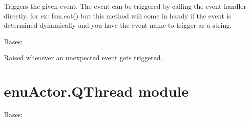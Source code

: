 \documentclass[letterpaper,10pt,english]{sphinxmanual}
\begin{document}
\begin{fulllineitems}
\begin{fulllineitems}
\end{fulllineitems}


\begin{fulllineitems}
\label{enuActor:enuActor.MyFSM.Fysom.trigger}
Triggers the given event.
The event can be triggered by calling the event handler directly, for ex: fsm.eat()
but this method will come in handy if the event is determined dynamically and you have
the event name to trigger as a string.

\end{fulllineitems}


\end{fulllineitems}


\begin{fulllineitems}
\label{enuActor:enuActor.MyFSM.FysomError}
Bases: 

Raised whenever an unexpected event gets triggered.

\end{fulllineitems}



\section{enuActor.QThread module}
\label{enuActor:module-enuActor.QThread}\label{enuActor:enuactor-qthread-module}

\begin{fulllineitems}
\label{enuActor:enuActor.QThread.QMsg}
Bases: 

\begin{fulllineitems}
\label{enuActor:enuActor.QThread.QMsg.DEFAULT_PRIORITY}
\end{fulllineitems}


\end{fulllineitems}

\end{document}
